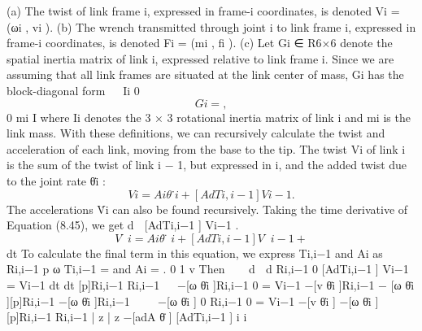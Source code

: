 \documentclass[12pt,a4paper]{article}
\begin{document}
  (a) The twist of link frame {i}, expressed in frame-{i} coordinates, is denoted
      Vi = (ωi , vi ).
  (b) The wrench transmitted through joint i to link frame {i}, expressed in
      frame-{i} coordinates, is denoted Fi = (mi , fi ).
  (c) Let Gi ∈ R6×6 denote the spatial inertia matrix of link i, expressed relative
      to link frame {i}. Since we are assuming that all link frames are situated
      at the link center of mass, Gi has the block-diagonal form
                                                  
                                          Ii   0
\begin{equation}
Gi =               ,
\label{eq:8.44}
\end{equation}
                                          0 mi I
       where Ii denotes the 3 × 3 rotational inertia matrix of link i and mi is the
       link mass.
    With these definitions, we can recursively calculate the twist and acceleration
of each link, moving from the base to the tip. The twist Vi of link i is the sum
of the twist of link i − 1, but expressed in {i}, and the added twist due to the
joint rate θ̇i :
\begin{equation}
Vi = Ai θ˙i + [AdTi,i−1 ]Vi−1 .
\label{eq:8.45}
\end{equation}
    The accelerations V̇i can also be found recursively. Taking the time derivative
of Equation (8.45), we get
                                              d             
                                                 [AdTi,i−1 ] Vi−1 .
\begin{equation}
V̇i = Ai θ̈i + [AdTi,i−1 ]V̇i−1 +
\label{eq:8.46}
\end{equation}
                                              dt
To calculate the final term in this equation, we express Ti,i−1 and Ai as
                                                             
                           Ri,i−1 p                           ω
               Ti,i−1 =                     and     Ai =          .
                             0      1                         v
Then
                                                       
  d                     d          Ri,i−1         0
     [AdTi,i−1 ] Vi−1 =                                     Vi−1
  dt                    dt       [p]Ri,i−1 Ri,i−1
                                                                              
                                      −[ω θ̇i ]Ri,i−1                 0
                      =                                                          Vi−1
                           −[v θ̇i ]Ri,i−1 − [ω θ̇i ][p]Ri,i−1 −[ω θ̇i ]Ri,i−1
                                                                      
                           −[ω θ̇i ]      0            Ri,i−1     0
                      =                                                    Vi−1
                           −[v θ̇i ] −[ω θ̇i ]        [p]Ri,i−1 Ri,i−1
                        |            {z          }|           {z         }
                                        −[adA θ̇ ]                  [AdTi,i−1 ]
                                                 i i
\end{document}
